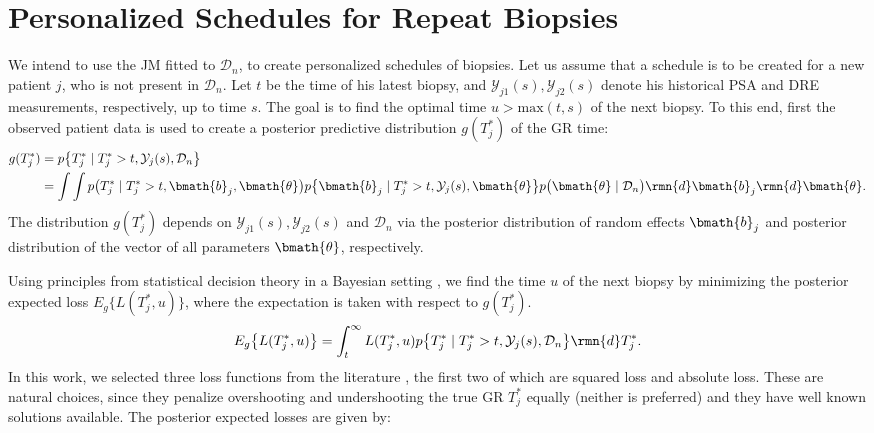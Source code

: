 \section{Personalized Schedules for Repeat Biopsies}
\label{sec : pers_sched_approaches}
We intend to use the JM fitted to $\mathcal{D}_n$, to create personalized schedules of biopsies. Let us assume that a schedule is to be created for a new patient $j$, who is not present in $\mathcal{D}_n$. Let $t$ be the time of his latest biopsy, and $\mathcal{Y}_{j1}(s), \mathcal{Y}_{j2}(s)$ denote his historical PSA and DRE measurements, respectively, up to time $s$. The goal is to find the optimal time $u > \mbox{max}(t,s)$ of the next biopsy. To this end, first the observed patient data is used to create a posterior predictive distribution $g(T^*_j)$ of the GR time:
\begin{equation*}
\label{eq : dyn_dist_fail_time}
\begin{split}
g(T^*_j) &= p\big\{T^*_j \mid T^*_j > t, \mathcal{Y}_j(s), \mathcal{D}_n\big\}\\
&= \int \int p\big(T^*_j \mid T^*_j > t, \bmath{b}_j, \bmath{\theta}\big)p\big\{\bmath{b}_j \mid T^*_j>t, \mathcal{Y}_j(s), \bmath{\theta}\big\}p\big(\bmath{\theta} \mid \mathcal{D}_n\big) \rmn{d} \bmath{b}_j \rmn{d} \bmath{\theta}.
\end{split}
\end{equation*}
The distribution $g(T^*_j)$ depends on $\mathcal{Y}_{j1}(s), \mathcal{Y}_{j2}(s)$ and $\mathcal{D}_n$ via the posterior distribution of random effects $\bmath{b}_j$ and posterior distribution of the vector of all parameters $\bmath{\theta}$, respectively.

Using principles from statistical decision theory in a Bayesian setting \citep{bergerDecisionTheory,robertBayesianChoice}, we find the time $u$ of the next biopsy by minimizing the posterior expected loss $E_g\big\{L(T^*_j, u)\big\}$, where the expectation is taken with respect to $g(T^*_j)$.
\begin{equation*}
E_g\big\{L(T^*_j, u)\big\} = \int_t^\infty L(T^*_j, u) p\big\{T^*_j \mid T^*_j > t, \mathcal{Y}_j(s), \mathcal{D}_n\big\} \rmn{d} T^*_j.
\end{equation*}
In this work, we selected three loss functions from the literature \citep{robertBayesianChoice}, the first two of which are squared loss and absolute loss. These are natural choices, since they penalize overshooting and undershooting the true GR $T^*_j$ equally (neither is preferred) and they have well known solutions available. The posterior expected losses are given by:

